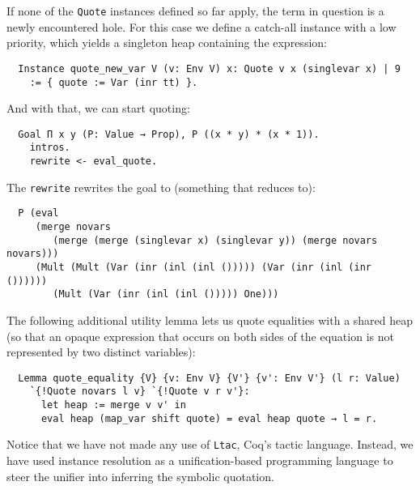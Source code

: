 \documentclass[a4paper,10pt,runningheads]{llncs}
\begin{document}
If none of the \lstinline|Quote| instances defined so far apply, the term in question is a newly encountered hole. For this case we define a catch-all instance with a low priority, which yields a singleton heap containing the expression:
\begin{lstlisting}
  Instance quote_new_var V (v: Env V) x: Quote v x (singlevar x) | 9
    := { quote := Var (inr tt) }.
\end{lstlisting}
And with that, we can start quoting:
\begin{lstlisting}
  Goal Π x y (P: Value → Prop), P ((x * y) * (x * 1)).
    intros.
    rewrite <- eval_quote.
\end{lstlisting}
The \lstinline|rewrite| rewrites the goal to (something that reduces to):
\begin{lstlisting}
  P (eval
     (merge novars
        (merge (merge (singlevar x) (singlevar y)) (merge novars novars)))
     (Mult (Mult (Var (inr (inl (inl ())))) (Var (inr (inl (inr ())))))
        (Mult (Var (inr (inl (inl ())))) One)))
\end{lstlisting}

The following additional utility lemma lets us quote equalities with a shared heap (so that an opaque expression that occurs on both sides of the equation is not represented by two distinct variables):
\begin{lstlisting}
  Lemma quote_equality {V} {v: Env V} {V'} {v': Env V'} (l r: Value)
    `{!Quote novars l v} `{!Quote v r v'}:
      let heap := merge v v' in
      eval heap (map_var shift quote) = eval heap quote → l = r.
\end{lstlisting}

Notice that we have not made any use of \lstinline|Ltac|, Coq's tactic language. Instead, we have used instance resolution as a unification-based programming language to steer the unifier into inferring the symbolic quotation.


\end{document}
